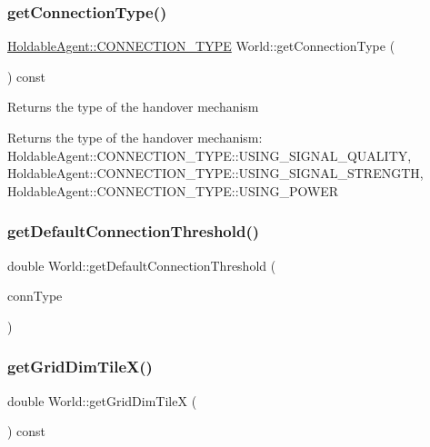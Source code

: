 \subsubsection{\texorpdfstring{get\+Connection\+Type()}{getConnectionType()}}
{\footnotesize\ttfamily \hyperlink{class_holdable_agent_ae2c334b004d7b9c5a999cf2618e4e518}{Holdable\+Agent\+::\+C\+O\+N\+N\+E\+C\+T\+I\+O\+N\+\_\+\+T\+Y\+PE} World\+::get\+Connection\+Type (\begin{DoxyParamCaption}{ }\end{DoxyParamCaption}) const}

Returns the type of the handover mechanism

\begin{DoxyReturn}{Returns}
the type of the handover mechanism\+: Holdable\+Agent\+::\+C\+O\+N\+N\+E\+C\+T\+I\+O\+N\+\_\+\+T\+Y\+P\+E\+::\+U\+S\+I\+N\+G\+\_\+\+S\+I\+G\+N\+A\+L\+\_\+\+Q\+U\+A\+L\+I\+TY, Holdable\+Agent\+::\+C\+O\+N\+N\+E\+C\+T\+I\+O\+N\+\_\+\+T\+Y\+P\+E\+::\+U\+S\+I\+N\+G\+\_\+\+S\+I\+G\+N\+A\+L\+\_\+\+S\+T\+R\+E\+N\+G\+TH, Holdable\+Agent\+::\+C\+O\+N\+N\+E\+C\+T\+I\+O\+N\+\_\+\+T\+Y\+P\+E\+::\+U\+S\+I\+N\+G\+\_\+\+P\+O\+W\+ER 
\end{DoxyReturn}
\mbox{\label{class_world_a5975f2673e84c87f8640737efd04590b}} 
\subsubsection{\texorpdfstring{get\+Default\+Connection\+Threshold()}{getDefaultConnectionThreshold()}}
{\footnotesize\ttfamily double World\+::get\+Default\+Connection\+Threshold (\begin{DoxyParamCaption}\item[{\hyperlink{class_holdable_agent_ae2c334b004d7b9c5a999cf2618e4e518}{Holdable\+Agent\+::\+C\+O\+N\+N\+E\+C\+T\+I\+O\+N\+\_\+\+T\+Y\+PE}}]{conn\+Type }\end{DoxyParamCaption})\hspace{0.3cm}{\ttfamily [private]}}

\mbox{\label{class_world_aa62f6cd42214191e37b904a672306888}} 
\subsubsection{\texorpdfstring{get\+Grid\+Dim\+Tile\+X()}{getGridDimTileX()}}
{\footnotesize\ttfamily double World\+::get\+Grid\+Dim\+TileX (\begin{DoxyParamCaption}{ }\end{DoxyParamCaption}) const}

